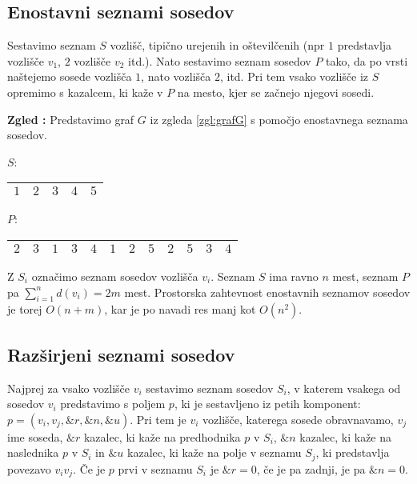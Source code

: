 \documentclass[a4paper, 10pt]{article}
\newcounter{zgledcount}
\newenvironment{zgled}{\begin{flushleft}\stepcounter{zgledcount}\textbf{Zgled \arabic{zgledcount}:}}{\hfill\end{flushleft}}
\begin{document}
	\subsection{Enostavni seznami sosedov}
	
	Sestavimo seznam $S$ vozlišč, tipično urejenih in oštevilčenih (npr $1$ predstavlja vozlišče $v_1$, $2$ vozlišče $v_2$ itd.). Nato sestavimo seznam sosedov $P$ tako, da po vrsti naštejemo sosede vozlišča $1$, nato vozlišča $2$, itd. Pri tem vsako vozlišče iz $S$ opremimo s kazalcem, ki kaže v $P$ na mesto, kjer se začnejo njegovi sosedi. 
	\begin{zgled}
		Predstavimo graf $G$ iz zgleda \ref{zgl:grafG} s pomočjo enostavnega seznama sosedov.
		\begin{table}[h!]
			$S$: \begin{tabular}{|c|c|c|c|c|}
				\hline
				$1$ & $2$ & $3$ & $4$ & $5$ \\\hline
			\end{tabular}
		\end{table}
		
		\begin{table}[h!]
			$P$: \begin{tabular}{|c|c||c|c|c||c|c|c||c|c||c|c|}
				\hline
				$2$ & $3$ & $1$ & $3$ & $4$ & $1$ & $2$ & $5$ & $2$ & $5$ & $3$ & $4$ \\\hline
			\end{tabular}
		\end{table}
	\end{zgled}
	Z $S_i$ označimo seznam sosedov vozlišča $v_i$. Seznam $S$ ima ravno $n$ mest, seznam $P$ pa $\sum_{i=1}^{n}d(v_i) = 2m$ mest. Prostorska zahtevnost enostavnih seznamov sosedov je torej $O(n + m)$, kar je po navadi res manj kot $O(n^2)$.
	\subsection{Razširjeni seznami sosedov}
	Najprej za vsako vozlišče $v_i$ sestavimo seznam sosedov $S_i$, v katerem vsakega od sosedov $v_i$ predstavimo s poljem $p$, ki je sestavljeno iz petih komponent: $p = (v_i, v_j, \&r, \&n, \&u)$. Pri tem je $v_i$ vozlišče, katerega sosede obravnavamo, $v_j$ ime soseda, $\&r$ kazalec, ki kaže na predhodnika $p$ v $S_i$, $\&n$ kazalec, ki kaže na naslednika $p$ v $S_i$ in $\&u$ kazalec, ki kaže na polje v seznamu $S_j$, ki predstavlja povezavo $v_iv_j$. Če je $p$ prvi v seznamu $S_i$ je $\&r = 0$, če je pa zadnji, je pa $\&n = 0$.
	
\end{document}
